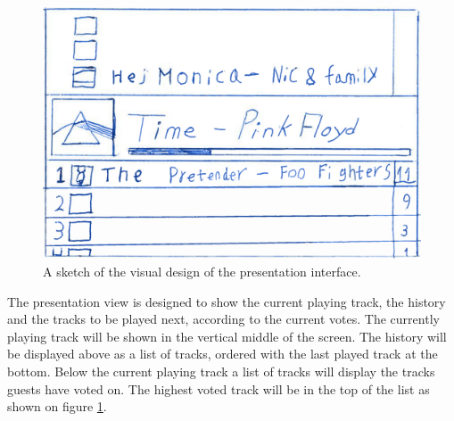 \begin{figure}[hbtp]
  \centering
  \includegraphics[width=1.0\linewidth]{Images/presentationInterface.png}
  \caption{A sketch of the visual design of the presentation interface.}\label{fig:presentation}
\end{figure}

The presentation view is designed to show the current playing track, the history and the tracks to be played next, according to the current votes. The currently playing track will be shown in the vertical middle of the screen. The history will be displayed above as a list of tracks, ordered with the last played track at the bottom. Below the current playing track a list of tracks will display the tracks guests have voted on. The highest voted track will be in the top of the list as shown on figure \cref{fig:presentation}.

